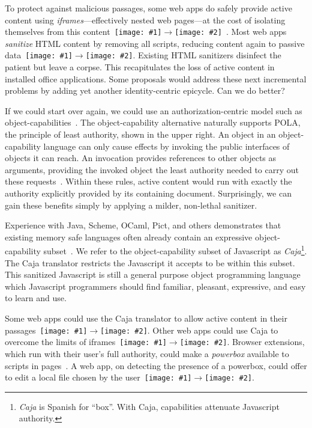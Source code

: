 \documentclass[letterpaper,twocolumn,10pt]{article}
\newcommand{\qq}[2]{{\texttt{[image: \#1]}}$\rightarrow${\texttt{[image: \#2]}}}
\begin{document}
To protect against malicious passages, some web apps do safely provide active 
content using \emph{iframes}---effectively nested web pages---at the cost of 
isolating themselves from this content~\qq{4}{3}~\cite{mashupos}. Most web 
apps \emph{sanitize} HTML content by removing all scripts, reducing content 
again to passive data~\qq{4}{1}. Existing HTML sanitizers disinfect the 
patient but leave a corpse. This recapitulates the loss of active content in 
installed office applications. Some proposals would address these next 
incremental problems by adding yet another identity-centric epicycle. Can we 
do better?

If we could start over again, we could use an authorization-centric model 
such as object-capabilities~\cite{DVH}. The object-capability alternative 
naturally supports POLA, the principle of least authority, shown in the upper 
right. An object in an object-capability language can only cause effects by 
invoking the public interfaces of objects it can reach. An invocation 
provides references to other objects as arguments, providing the invoked 
object the least authority needed to carry out these 
requests~\cite{RobustComposition}. Within these rules, active content would 
run with exactly the authority explicitly provided by its containing document. 
Surprisingly, we can gain these benefits simply by applying a milder, 
non-lethal sanitizer.

Experience with Java, Scheme, OCaml, Pict, and others demonstrates that 
existing memory safe languages often already contain an expressive 
object-capability subset~\cite[respectively]{joe-e, rees96security, emily, 
backwater}. We refer to the object-capability subset of Javascript as 
\emph{Caja}\footnote{
%
\emph{Caja} is Spanish for ``box''. With Caja, capabilities attenuate 
Javascript authority.
%
}. The Caja translator restricts the Javascript it accepts to be within this 
subset. This sanitized Javascript is still a general purpose object 
programming language which Javascript programmers should find familiar, 
pleasant, expressive, and easy to learn and use.

Some web apps could use the Caja translator to allow active content in their 
passages~\qq{1}{5}. Other web apps could use Caja to overcome the limits of 
iframes~\qq{3}{5}. Browser extensions, which run with their user's full 
authority, could make a \emph{powerbox} available to scripts in 
pages~\cite{darpareview, stiegler:polaris, seaborn:plash, bitfrost}. A web 
app, on detecting the presence of a powerbox, could offer to edit a local 
file chosen by the user~\qq{4}{6}.
\end{document}
